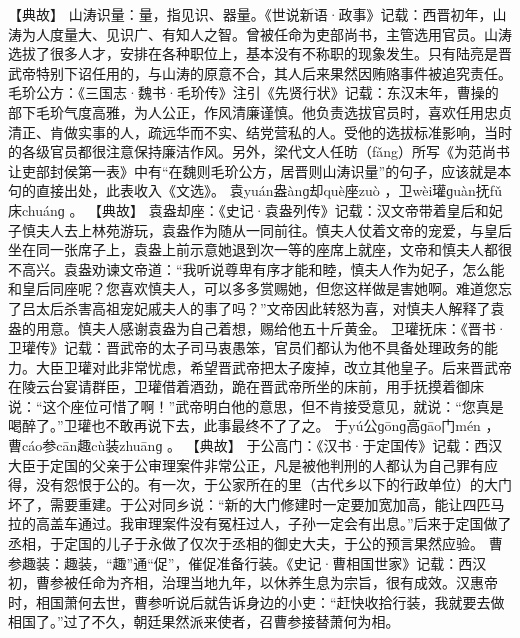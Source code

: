 \documentclass[12pt,UTF8]{ctexbook}
\begin{document}
【典故】
山涛识量：量，指见识、器量。《世说新语·政事》记载：西晋初年，山涛为人度量大、见识广、有知人之智。曾被任命为吏部尚书，主管选用官员。山涛选拔了很多人才，安排在各种职位上，基本没有不称职的现象发生。只有陆亮是晋武帝特别下诏任用的，与山涛的原意不合，其人后来果然因贿赂事件被追究责任。
毛玠公方：《三国志·魏书·毛玠传》注引《先贤行状》记载：东汉末年，曹操的部下毛玠气度高雅，为人公正，作风清廉谨慎。他负责选拔官员时，喜欢任用忠贞清正、肯做实事的人，疏远华而不实、结党营私的人。受他的选拔标准影响，当时的各级官员都很注意保持廉洁作风。另外，梁代文人任昉（fǎng）所写《为范尚书让吏部封侯第一表》中有“在魏则毛玠公方，居晋则山涛识量”的句子，应该就是本句的直接出处，此表收入《文选》。
袁yuán盎ànɡ却què座zuò
，卫wèi瓘ɡuàn抚fǔ床chuánɡ
。
【典故】
袁盎却座：《史记·袁盎列传》记载：汉文帝带着皇后和妃子慎夫人去上林苑游玩，袁盎作为随从一同前往。慎夫人仗着文帝的宠爱，与皇后坐在同一张席子上，袁盎上前示意她退到次一等的座席上就座，文帝和慎夫人都很不高兴。袁盎劝谏文帝道：“我听说尊卑有序才能和睦，慎夫人作为妃子，怎么能和皇后同座呢？您喜欢慎夫人，可以多多赏赐她，但您这样做是害她啊。难道您忘了吕太后杀害高祖宠妃戚夫人的事了吗？”文帝因此转怒为喜，对慎夫人解释了袁盎的用意。慎夫人感谢袁盎为自己着想，赐给他五十斤黄金。
卫瓘抚床：《晋书·卫瓘传》记载：晋武帝的太子司马衷愚笨，官员们都认为他不具备处理政务的能力。大臣卫瓘对此非常忧虑，希望晋武帝把太子废掉，改立其他皇子。后来晋武帝在陵云台宴请群臣，卫瓘借着酒劲，跪在晋武帝所坐的床前，用手抚摸着御床说：“这个座位可惜了啊！”武帝明白他的意思，但不肯接受意见，就说：“您真是喝醉了。”卫瓘也不敢再说下去，此事最终不了了之。
于yú公ɡōnɡ高ɡāo门mén
，曹cáo参cān趣cù装zhuānɡ
。
【典故】
于公高门：《汉书·于定国传》记载：西汉大臣于定国的父亲于公审理案件非常公正，凡是被他判刑的人都认为自己罪有应得，没有怨恨于公的。有一次，于公家所在的里（古代乡以下的行政单位）的大门坏了，需要重建。于公对同乡说：“新的大门修建时一定要加宽加高，能让四匹马拉的高盖车通过。我审理案件没有冤枉过人，子孙一定会有出息。”后来于定国做了丞相，于定国的儿子于永做了仅次于丞相的御史大夫，于公的预言果然应验。
曹参趣装：趣装，“趣”通“促”，催促准备行装。《史记·曹相国世家》记载：西汉初，曹参被任命为齐相，治理当地九年，以休养生息为宗旨，很有成效。汉惠帝时，相国萧何去世，曹参听说后就告诉身边的小吏：“赶快收拾行装，我就要去做相国了。”过了不久，朝廷果然派来使者，召曹参接替萧何为相。
\end{document}
